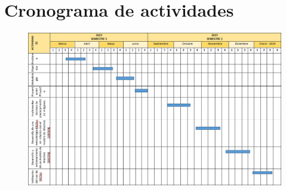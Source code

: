 \section{Cronograma de actividades}


\begin{figure}[h]
\centering
\includegraphics[width=1\textwidth]{img/cronogramaActividades.png}
\label{fig:figuraCronograma}
\end{figure}